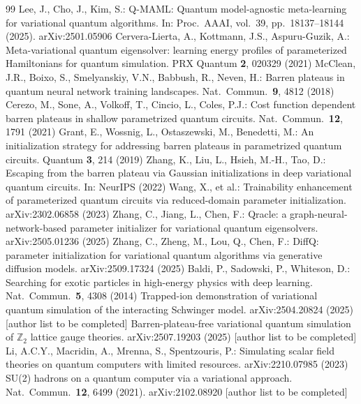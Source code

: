 \documentclass[pdflatex,sn-mathphys-num]{sn-jnl}
\begin{document}
\begin{thebibliography}{99}
 Lee, J., Cho, J., Kim, S.: Q-MAML: Quantum model-agnostic meta-learning for variational quantum algorithms. In: Proc.\ AAAI, vol.\ 39, pp.\ 18137--18144 (2025). arXiv:2501.05906
 Cervera-Lierta, A., Kottmann, J.S., Aspuru-Guzik, A.: Meta-variational quantum eigensolver: learning energy profiles of parameterized Hamiltonians for quantum simulation. PRX Quantum \textbf{2}, 020329 (2021)
 McClean, J.R., Boixo, S., Smelyanskiy, V.N., Babbush, R., Neven, H.: Barren plateaus in quantum neural network training landscapes. Nat.\ Commun.\ \textbf{9}, 4812 (2018)
 Cerezo, M., Sone, A., Volkoff, T., Cincio, L., Coles, P.J.: Cost function dependent barren plateaus in shallow parametrized quantum circuits. Nat.\ Commun.\ \textbf{12}, 1791 (2021)
 Grant, E., Wossnig, L., Ostaszewski, M., Benedetti, M.: An initialization strategy for addressing barren plateaus in parametrized quantum circuits. Quantum \textbf{3}, 214 (2019)
 Zhang, K., Liu, L., Hsieh, M.-H., Tao, D.: Escaping from the barren plateau via Gaussian initializations in deep variational quantum circuits. In: NeurIPS (2022)
 Wang, X., et al.: Trainability enhancement of parameterized quantum circuits via reduced-domain parameter initialization. arXiv:2302.06858 (2023)
 Zhang, C., Jiang, L., Chen, F.: Qracle: a graph-neural-network-based parameter initializer for variational quantum eigensolvers. arXiv:2505.01236 (2025)
 Zhang, C., Zheng, M., Lou, Q., Chen, F.: DiffQ: parameter initialization for variational quantum algorithms via generative diffusion models. arXiv:2509.17324 (2025)
 Baldi, P., Sadowski, P., Whiteson, D.: Searching for exotic particles in high-energy physics with deep learning. Nat.\ Commun.\ \textbf{5}, 4308 (2014)
 Trapped-ion demonstration of variational quantum simulation of the interacting Schwinger model. arXiv:2504.20824 (2025) [author list to be completed]
 Barren-plateau-free variational quantum simulation of $\mathbb{Z}_2$ lattice gauge theories. arXiv:2507.19203 (2025) [author list to be completed]
 Li, A.C.Y., Macridin, A., Mrenna, S., Spentzouris, P.: Simulating scalar field theories on quantum computers with limited resources. arXiv:2210.07985 (2023)
 SU(2) hadrons on a quantum computer via a variational approach. Nat.\ Commun.\ \textbf{12}, 6499 (2021). arXiv:2102.08920 [author list to be completed]

\end{thebibliography}
\end{document}

